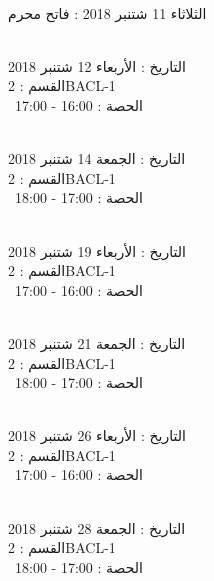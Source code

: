 \par
\noindent\makebox[\linewidth]{\rule{\paperwidth}{0.4pt}}
 \\
الثلاثاء 11 شتنبر 2018 :   فاتح محرم
\par
\noindent\makebox[\linewidth]{\rule{\paperwidth}{0.4pt}}
 \\
التاريخ : الأربعاء 12 شتنبر 2018 \\
القسم : 2BACL-1 \\
 \  
الحصة : 16:00 - 17:00 \\
\par
\noindent\makebox[\linewidth]{\rule{\paperwidth}{0.4pt}}
 \\
التاريخ : الجمعة 14 شتنبر 2018 \\
القسم : 2BACL-1 \\
 \  
الحصة : 17:00 - 18:00 \\
\par
\noindent\makebox[\linewidth]{\rule{\paperwidth}{0.4pt}}
 \\
التاريخ : الأربعاء 19 شتنبر 2018 \\
القسم : 2BACL-1 \\
 \  
الحصة : 16:00 - 17:00 \\
\par
\noindent\makebox[\linewidth]{\rule{\paperwidth}{0.4pt}}
 \\
التاريخ : الجمعة 21 شتنبر 2018 \\
القسم : 2BACL-1 \\
 \  
الحصة : 17:00 - 18:00 \\
\par
\noindent\makebox[\linewidth]{\rule{\paperwidth}{0.4pt}}
 \\
التاريخ : الأربعاء 26 شتنبر 2018 \\
القسم : 2BACL-1 \\
 \  
الحصة : 16:00 - 17:00 \\
\par
\noindent\makebox[\linewidth]{\rule{\paperwidth}{0.4pt}}
 \\
التاريخ : الجمعة 28 شتنبر 2018 \\
القسم : 2BACL-1 \\
 \  
الحصة : 17:00 - 18:00 \\
\par
